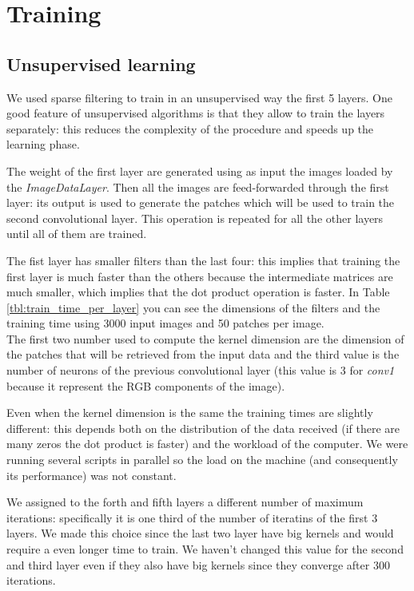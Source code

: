\section{Training}

\subsection{Unsupervised learning}

We used sparse filtering to train in an unsupervised way the first 5 layers. One good feature of unsupervised algorithms is that they allow to train the layers separately:  this reduces the complexity of the procedure and speeds up the learning phase.

The weight of the first layer are generated using as input the images loaded by the \textit{ImageDataLayer}. Then all the images are feed-forwarded through the first layer: its output is used to generate the patches which will be used to train the second convolutional layer. This operation is repeated for all the other layers until all of them are trained.

The fist layer has smaller filters than the last four: this implies that training the first layer is much faster than the others because the intermediate matrices are much smaller, which implies that the dot product operation is faster. In Table \ref{tbl:train_time_per_layer} you can see the dimensions of the filters and the training time using 3000 input images and 50 patches per image.\\

The first two number used to compute the kernel dimension are the dimension of the patches that will be retrieved from the input data and the third value is the number of neurons of the previous convolutional layer (this value is 3 for \textit{conv1} because it represent the RGB components of the image).

Even when the kernel dimension is the same the training times are slightly different: this depends both on the distribution of the data received (if there are many zeros the dot product is faster) and the workload of the computer. We were running several scripts in parallel so the load on the machine (and consequently its performance) was not constant.

We assigned to the forth and fifth layers a different number of maximum iterations: specifically it is one third of the number of iteratins of the first 3 layers. We made this choice since the last two layer have big kernels and would require a even longer time to train. We haven't changed this value for the second and third layer even if they also have big kernels since they converge after 300 iterations.\\

